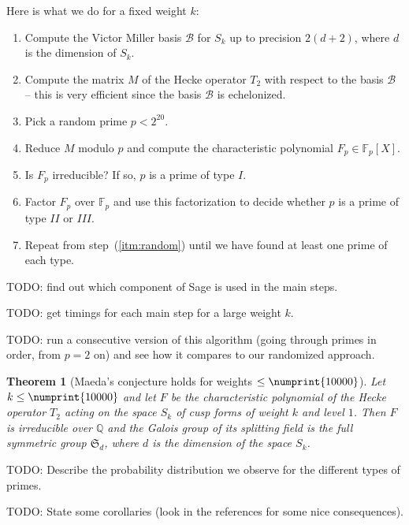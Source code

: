 \documentclass[11pt]{article}
\theoremstyle{plain}
\newtheorem{theorem}{Theorem}[section]
\theoremstyle{definition}
\theoremstyle{remark}
\numberwithin{equation}{section}
\numberwithin{table}{section}
\newcommand{\FF}{\mathbb{F}}
\newcommand{\QQ}{\mathbb{Q}}
\newcommand{\cB}{\mathcal{B}}
\renewcommand{\SS}{\mathfrak{S}}
\newcommand{\bound}{\numprint{10000}}
\begin{document}
Here is what we do for a fixed weight $k$:
\begin{enumerate}
  \item Compute the Victor Miller basis $\cB$ for $S_k$ up to precision
    $2(d+2)$, where $d$ is the dimension of $S_k$.
  \item Compute the matrix $M$ of the Hecke operator $T_2$ with respect to the
    basis $\cB$ -- this is very efficient since the basis $\cB$ is
    echelonized.
  \item\label{itm:random} Pick a random prime $p<2^{20}$.
  \item Reduce $M$ modulo $p$ and compute the characteristic polynomial
    $F_p\in \FF_p[X]$.
  \item Is $F_p$ irreducible?  If so, $p$ is a prime of type $I$.
  \item Factor $F_p$ over $\FF_p$ and use this factorization to decide whether
    $p$ is a prime of type $II$ or $III$.
  \item Repeat from step~(\ref{itm:random}) until we have found at
    least one prime of each type.
\end{enumerate}

TODO: find out which component of Sage is used in the main steps.

TODO: get timings for each main step for a large weight $k$.

TODO: run a consecutive version of this algorithm (going through primes in
order, from $p=2$ on) and see how it compares to our randomized approach.

\begin{theorem}[Maeda's conjecture holds for weights $\leq \bound$]
  Let $k\leq \bound$ and let $F$ be the characteristic polynomial of the
  Hecke operator $T_2$ acting on the space $S_k$ of cusp forms of weight
  $k$ and level $1$.  Then $F$ is irreducible over $\QQ$ and the Galois
  group of its splitting field is the full symmetric group $\SS_d$, 
  where $d$ is the dimension of the space $S_k$.
\end{theorem}


TODO: Describe the probability distribution we observe for the different types
of primes.

TODO: State some corollaries (look in the references for some nice
consequences).


\printbibliography
\end{document}
